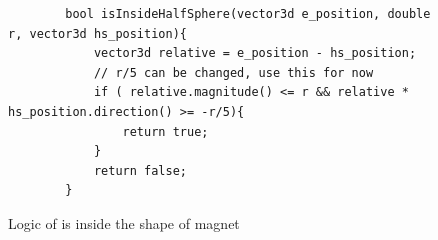 \documentclass[a4paper,oneside,12pt]{report}
\numberwithin{equation}{chapter}
\begin{document}
\begin{figure}[H]
    \centering
    \captionsetup{justification=centering}
    \begin{verbatim}
        bool isInsideHalfSphere(vector3d e_position, double r, vector3d hs_position){
            vector3d relative = e_position - hs_position;       
            // r/5 can be changed, use this for now                                
            if ( relative.magnitude() <= r && relative * hs_position.direction() >= -r/5){      
                return true;                                                                 
            }
            return false;
        }
    \end{verbatim}
\caption{Logic of is \e inside the shape of magnet}
\label{fig:is_inside_halfsphere}
\end{figure}
\end{document}
